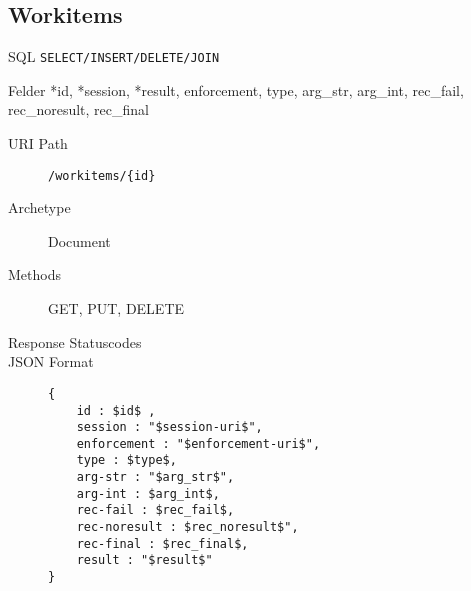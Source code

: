 \documentclass[10pt,a4paper]{scrartcl}
\begin{document}
\pagebreak
\subsection{Workitems}

\begin{description*}
    \item[SQL] \texttt{SELECT/INSERT/DELETE/JOIN}
    \item[Felder] *id, *session, *result, enforcement, type, arg\_str, arg\_int, rec\_fail, rec\_noresult, rec\_final
\end{description*}


\begin{mdframed}[style=def]
\begin{description}
	\item[URI Path] \texttt{/workitems/\{id\}}
	\item[Archetype] Document
	\item[Methods] GET, PUT, DELETE
	\item[Response Statuscodes] \hfill
	\item[JSON Format] \hfill
\begin{lstlisting}
{
	id : $id$ ,
	session : "$session-uri$",
	enforcement : "$enforcement-uri$",
	type : $type$,
	arg-str : "$arg_str$",
	arg-int : $arg_int$,
	rec-fail : $rec_fail$,
	rec-noresult : $rec_noresult$", 
	rec-final : $rec_final$,
	result : "$result$"
}
\end{lstlisting}
\end{description}
\end{mdframed}
\end{document}
